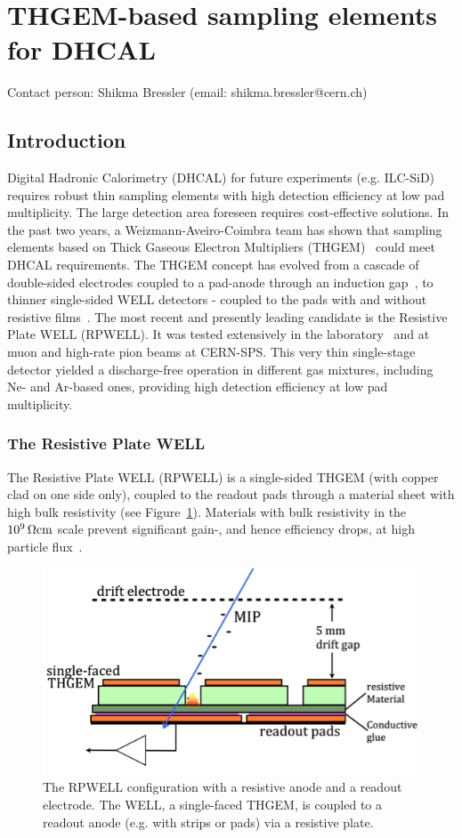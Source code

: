 \section{THGEM-based sampling elements for DHCAL}
Contact person: Shikma Bressler (email: shikma.bressler@cern.ch)
\subsection{Introduction}
Digital Hadronic Calorimetry (DHCAL) for future experiments (e.g. ILC-SiD) requires robust thin sampling elements with high detection efficiency at low pad multiplicity. The large detection area foreseen requires cost-effective solutions.
In the past two years, a Weizmann-Aveiro-Coimbra team has shown that sampling elements based on Thick Gaseous Electron Multipliers (THGEM)~\cite{Chechik2004303} could meet DHCAL requirements. The THGEM concept has evolved from a cascade of double-sided electrodes coupled to a pad-anode through an induction gap~\cite{1748-0221-7-05-C05011}, to thinner single-sided WELL detectors - coupled to the pads with and without resistive films~\cite{1748-0221-9-04-P04011,1748-0221-8-07-P07017}.
The most recent and presently leading candidate is the Resistive Plate WELL (RPWELL). It was tested extensively in the laboratory~\cite{1748-0221-8-11-P11004,1748-0221-8-12-C12012} and at muon and high-rate pion beams at CERN-SPS. This very thin single-stage detector yielded a discharge-free operation in different gas mixtures, including Ne- and Ar-based ones, providing high detection efficiency at low pad multiplicity.

\subsubsection{The Resistive Plate WELL}
The Resistive Plate WELL (RPWELL) is a single-sided THGEM (with copper clad on one side only), coupled to the readout pads through a material sheet with high bulk resistivity (see Figure~\ref{fig:Calorimeter:THGEM:rpwell}). Materials with bulk resistivity in the $\unit[10^9]{\Omega cm}$ scale prevent significant gain-, and hence efficiency drops, at high particle flux~\cite{1748-0221-8-11-P11004}.
\begin{figure}
	\centering
	\includegraphics[width=.5\textwidth]{Calorimeter/THGEM/rpwell.png}
	\caption{The RPWELL configuration with a resistive anode and a readout electrode. The WELL, a single-faced THGEM, is coupled to a readout anode (e.g. with strips or pads) via a resistive plate.}
	\label{fig:Calorimeter:THGEM:rpwell}
\end{figure}

